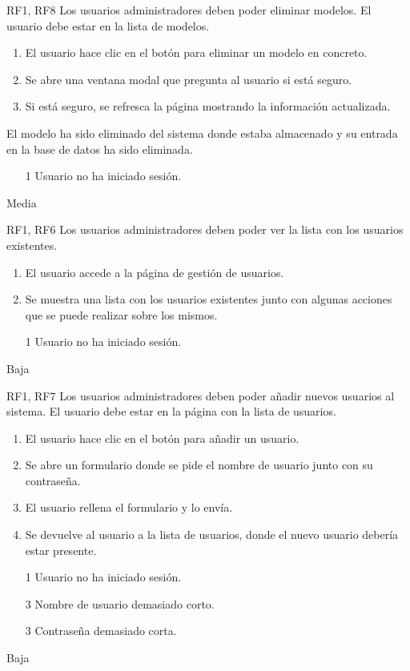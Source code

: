 {RF1, RF8}
{Los usuarios administradores deben poder eliminar modelos.}
{El usuario debe estar en la lista de modelos.}
{
    \begin{enumerate}
        \def\labelenumi{\arabic{enumi}.}
        \tightlist
        \item El usuario hace clic en el botón para eliminar un modelo en concreto.
        \item Se abre una ventana modal que pregunta al usuario si está seguro.
        \item Si está seguro, se refresca la página mostrando la información actualizada.
    \end{enumerate}
}
{
    El modelo ha sido eliminado del sistema donde estaba almacenado y su entrada en
    la base de datos ha sido eliminada.
}
{
    \begin{itemize}
        \item [1] Usuario no ha iniciado sesión.
    \end{itemize}
}
{Media}

{RF1, RF6}
{Los usuarios administradores deben poder ver la lista con los usuarios existentes.}
{}
{
    \begin{enumerate}
        \def\labelenumi{\arabic{enumi}.}
        \tightlist
        \item El usuario accede a la página de gestión de usuarios.
        \item Se muestra una lista con los usuarios existentes junto con algunas acciones que se puede realizar sobre los mismos.
    \end{enumerate}
}
{}
{
    \begin{itemize}
        \item [1] Usuario no ha iniciado sesión.
    \end{itemize}
}
{Baja}

{RF1, RF7}
{Los usuarios administradores deben poder añadir nuevos usuarios al sistema.}
{El usuario debe estar en la página con la lista de usuarios.}
{
    \begin{enumerate}
        \def\labelenumi{\arabic{enumi}.}
        \tightlist
        \item El usuario hace clic en el botón para añadir un usuario.
        \item Se abre un formulario donde se pide el nombre de usuario junto con
        su contraseña.
        \item El usuario rellena el formulario y lo envía.
        \item Se devuelve al usuario a la lista de usuarios, donde el nuevo
              usuario debería estar presente.
    \end{enumerate}
}
{}
{
    \begin{itemize}
        \item [1] Usuario no ha iniciado sesión.
        \item [3] Nombre de usuario demasiado corto.
        \item [3] Contraseña demasiado corta.
    \end{itemize}
}
{Baja}

